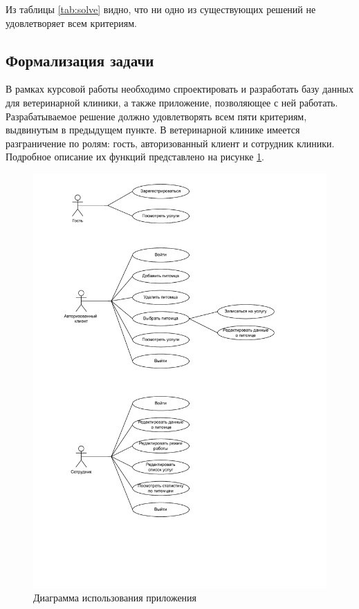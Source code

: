 Из таблицы \ref{tab:solve} видно, что ни одно из существующих решений не удовлетворяет всем критериям.

\subsection{Формализация задачи}

В рамках курсовой работы необходимо спроектировать и разработать базу данных для ветеринарной клиники, а также приложение, позволяющее с ней работать. Разрабатываемое решение должно удовлетворять всем пяти критериям, выдвинутым в предыдущем пункте. В ветеринарной клинике имеется разграничение по ролям: гость, авторизованный клиент и сотрудник клиники. Подробное описание их функций представлено на рисунке \ref{img:use-case}.

\begin{figure}[!h]
	\centering
	\includegraphics[width=150mm]{image/use-case.pdf}
	\caption{Диаграмма использования приложения}
	\label{img:use-case}
\end{figure}

